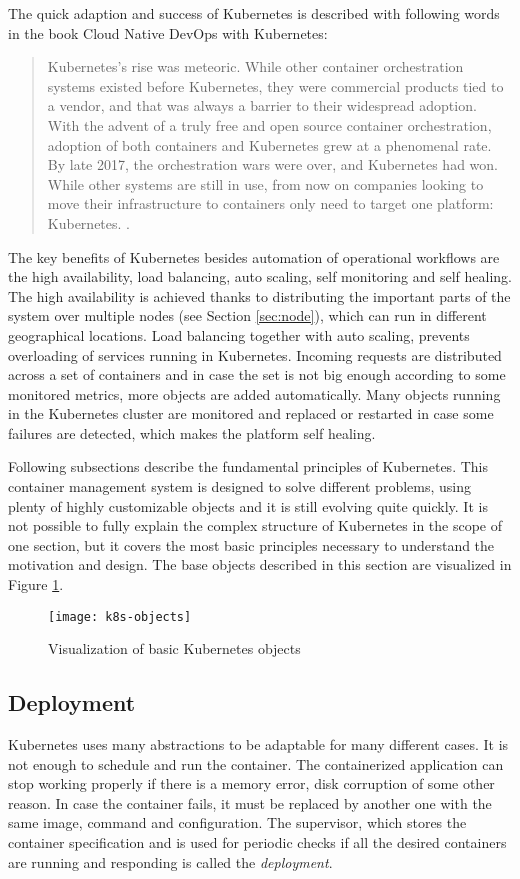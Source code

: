 \documentclass[
  digital, %
  twoside, %
  table,   %
  lof,     %
  lot,     %
]{fithesis3}
\begin{document}
The quick adaption and success of Kubernetes is described with following words in the book Cloud Native DevOps with Kubernetes:
\begin{quote}
Kubernetes’s rise was meteoric. While other container orchestration systems existed
before Kubernetes, they were commercial products tied to a vendor, and that was
always a barrier to their widespread adoption. With the advent of a truly free and
open source container orchestration, adoption of both containers and Kubernetes grew
at a phenomenal rate.
By late 2017, the orchestration wars were over, and Kubernetes had won. While other
systems are still in use, from now on companies looking to move their infrastructure
to containers only need to target one platform: Kubernetes. \cite[p. 11]{k8s}.
\end{quote}

The key benefits of Kubernetes \cite{k8s_features} besides automation of operational workflows are the high availability, load balancing, auto scaling, self monitoring and self healing. The high availability is achieved thanks to distributing the important parts of the system over multiple nodes (see Section \ref{sec:node}), which can run in different geographical locations. Load balancing together with auto scaling, prevents overloading of services running in Kubernetes. Incoming requests are distributed across a set of containers and in case the set is not big enough according to some monitored metrics, more objects are added automatically. Many objects running in the Kubernetes cluster are monitored and replaced or restarted in case some failures are detected, which makes the platform self healing.

Following subsections describe the fundamental principles of Kubernetes. This container management system is designed to solve different problems, using plenty of highly customizable objects and it is still evolving quite quickly. It is not possible to fully explain the complex structure of Kubernetes in the scope of one section, but it covers the most basic principles necessary to understand the motivation and design. The base objects described in this section are visualized in Figure \ref{fig:k8s_objects}.

\begin{figure}[H]
\caption{Visualization of basic Kubernetes objects}
\centering
\texttt{[image: k8s-objects]}
\label{fig:k8s_objects}
\end{figure}

\subsection{Deployment} \label{sec:deployment}
Kubernetes uses many abstractions to be adaptable for many different cases. It is not enough to schedule and run the container. The containerized application can stop working properly if there is a memory error, disk corruption of some other reason. In case the container fails, it must be replaced by another one with the same image, command and configuration. The supervisor, which stores the container specification and is used for periodic checks if all the desired containers are running and responding is called the \textit{deployment}.
\end{document}
